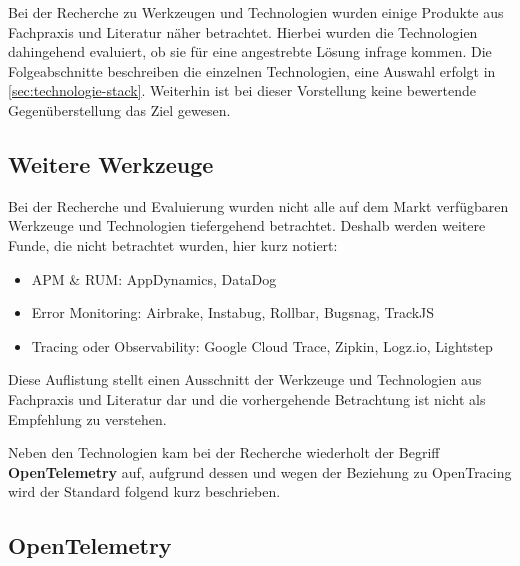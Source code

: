 
Bei der Recherche zu Werkzeugen und Technologien wurden einige Produkte aus Fachpraxis und Literatur näher betrachtet. Hierbei wurden die Technologien dahingehend evaluiert, ob sie für eine angestrebte Lösung infrage kommen. Die Folgeabschnitte beschreiben die einzelnen Technologien, eine Auswahl erfolgt in \autoref{sec:technologie-stack}. Weiterhin ist bei dieser Vorstellung keine bewertende Gegenüberstellung das Ziel gewesen.

\subsection{Weitere Werkzeuge}
\label{sec:weitere-werkzeuge}

Bei der Recherche und Evaluierung wurden nicht alle auf dem Markt verfügbaren Werkzeuge und Technologien tiefergehend betrachtet. Deshalb werden weitere Funde, die nicht betrachtet wurden, hier kurz notiert:

\begin{itemize}
	\item APM \& RUM: AppDynamics, DataDog
	\item Error Monitoring: Airbrake, Instabug, Rollbar, Bugsnag, TrackJS
	\item Tracing oder Observability: Google Cloud Trace, Zipkin, Logz.io, Lightstep
\end{itemize}

Diese Auflistung stellt einen Ausschnitt der Werkzeuge und Technologien aus Fachpraxis und Literatur dar und die vorhergehende Betrachtung ist nicht als Empfehlung zu verstehen.

Neben den Technologien kam bei der Recherche wiederholt der Begriff \textbf{OpenTelemetry} auf, aufgrund dessen und wegen der Beziehung zu OpenTracing wird der Standard folgend kurz beschrieben.

\newpage

\subsection{OpenTelemetry}

